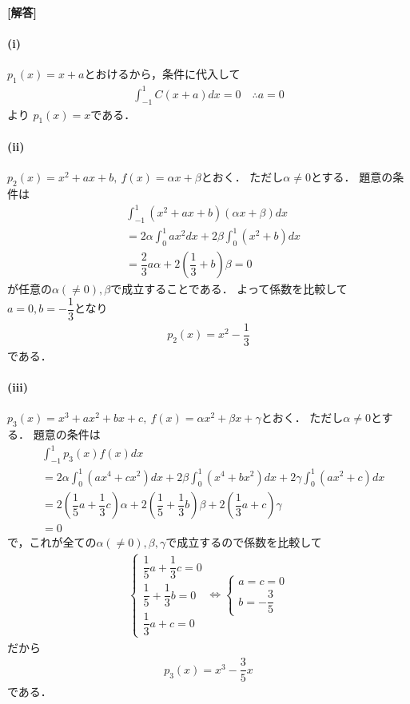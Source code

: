 \documentclass[../../main.tex]{subfiles}
\begin{document}
\begin{oframed}
  
\end{oframed}

{\bf [解答]}

\paragraph{(i)}

$p_1(x) = x + a$とおけるから，条件に代入して
\begin{align}
  \int_{-1}^1 C(x+a) dx = 0 \quad \therefore a = 0
\end{align}
より $p_1(x) = x$である．

\paragraph{(ii)}

$p_2(x) = x^2 + ax + b, \ f(x) = \alpha x + \beta$とおく．
ただし$\alpha \neq 0$とする．
題意の条件は
\begin{align}
  &\int_{-1}^1 (x^2+ax+b)(\alpha x+\beta) dx \\
  &= 2\alpha \int_0^1 ax^2 dx + 2\beta \int_0^1 (x^2+b) dx \\
  &= \dfrac{2}{3}a\alpha + 2\left(\dfrac{1}{3}+b\right)\beta = 0
\end{align}
が任意の$\alpha (\neq 0), \beta$で成立することである．
よって係数を比較して $a=0, b=-\dfrac{1}{3}$となり
\begin{align}
  p_2(x) = x^2 - \dfrac{1}{3}
\end{align}
である．

\paragraph{(iii)}

$p_3(x) = x^3 + ax^2 + bx + c, \ f(x) = \alpha x^2 + \beta x + \gamma$とおく．
ただし$\alpha \neq 0$とする．
題意の条件は
\begin{align}
  &\int_{-1}^1 p_3(x) f(x) dx \\
  &= 2\alpha \int_0^1 (ax^4+cx^2) dx + 2\beta \int_0^1 (x^4+bx^2) dx + 2\gamma \int_0^1 (ax^2+c) dx \\
  &= 2\left(\dfrac{1}{5}a+\dfrac{1}{3}c\right)\alpha + 2\left(\dfrac{1}{5}+\dfrac{1}{3}b\right)\beta + 2\left(\dfrac{1}{3}a+c\right)\gamma \\
  &= 0
\end{align}
で，これが全ての$\alpha (\neq 0), \beta, \gamma$で成立するので係数を比較して
\begin{align}
  \begin{cases}
    \dfrac{1}{5}a + \dfrac{1}{3}c = 0 \\
    \dfrac{1}{5} + \dfrac{1}{3}b = 0 \\
    \dfrac{1}{3}a + c = 0
  \end{cases}
  \iff
  \begin{cases}
    a=c=0 \\
    b=-\dfrac{3}{5}
  \end{cases}
\end{align}
だから
\begin{align}
  p_3(x) = x^3 - \dfrac{3}{5}x
\end{align}
である．
\end{document}
